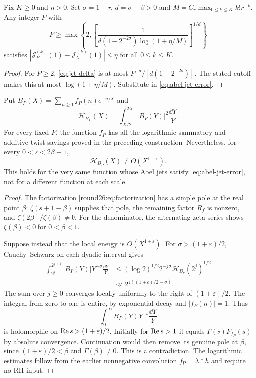 \begin{corollary}\label{cor:jet-cutoff}
Fix $K\ge0$ and $\eta>0$. Set $\sigma=1-r$,
$d=\sigma-\beta>0$ and
$M=C_r\max_{0\le k\le K}k!r^{-k}$. Any integer $P$ with
\begin{equation}\label{eq:jet-cutoff}
 P\ge\max\left\{2,
 \left[\frac1{d(1-2^{-2\sigma})\log(1+\eta/M)}\right]^{1/d}
       \right\}
\end{equation}
satisfies $|\mathcal J_P^{(k)}(1)-\mathcal J_\lambda^{(k)}(1)|\le\eta$
for all $0\le k\le K$.
\end{corollary}
\begin{proof}
For $P\ge2$, \eqref{eq:jet-delta} is at most
$P^{-d}/[d(1-2^{-2\sigma})]$. The stated cutoff makes this at most
$\log(1+\eta/M)$. Substitute in \eqref{eq:abel-jet-error}.
\end{proof}

\begin{theorem}
\label{thm:jets-do-not-bound-energy}
Put $B_P(X)=\sum_{n\ge1}f_P(n)e^{-n/X}$ and
\[
 \mathcal H_{B_P}(X)=\int_{X/2}^{2X}|B_P(Y)|^2\frac{\dd Y}{Y}.
\]
For every fixed $P$, the function $f_P$ has all the logarithmic
summatory and additive-twist savings proved in the preceding
construction. Nevertheless, for every $0<\varepsilon<2\beta-1$,
\begin{equation}\label{eq:jet-energy-failure}
 \mathcal H_{B_P}(X)\ne O(X^{1+\varepsilon}).
\end{equation}
This holds for the very same function whose Abel jets satisfy
\eqref{eq:abel-jet-error}, not for a different function at each scale.
\end{theorem}
\begin{proof}
The factorization \eqref{round26:eq:factorization} has a simple pole
at the real point $\beta$: $\zeta(s+1-\beta)$ supplies that pole,
the remaining factor $R_f$ is nonzero, and
$\zeta(2\beta)/\zeta(\beta)\ne0$.
For the denominator, the alternating zeta series shows
$\zeta(\beta)<0$ for $0<\beta<1$.

Suppose instead that the local energy is $O(X^{1+\varepsilon})$.
For $\sigma>(1+\varepsilon)/2$, Cauchy--Schwarz on each dyadic interval
gives
\begin{align*}
 \int_{2^j}^{2^{j+1}}|B_P(Y)|Y^{-\sigma}\frac{\dd Y}{Y}
 &\le(\log2)^{1/2}2^{-j\sigma}
            \mathcal H_{B_P}(2^j)^{1/2}\\
 &\ll2^{j((1+\varepsilon)/2-\sigma)}.
\end{align*}
The sum over $j\ge0$ converges locally uniformly to the right of
$(1+\varepsilon)/2$. The integral from zero to one is entire,
by exponential decay and $|f_P(n)|=1$. Thus
\[
 \int_0^\infty B_P(Y)Y^{-s}\frac{\dd Y}{Y}
\]
is holomorphic on $\operatorname{Re} s>(1+\varepsilon)/2$. Initially for $\operatorname{Re} s>1$
it equals $\Gamma(s)F_{f_P}(s)$ by absolute convergence. Continuation
would then remove its genuine pole at $\beta$, since
$(1+\varepsilon)/2<\beta$ and $\Gamma(\beta)\ne0$. This is a
contradiction. The logarithmic estimates follow from the earlier
nonnegative convolution $f_P=\lambda*h$ and require no RH input.
\end{proof}

